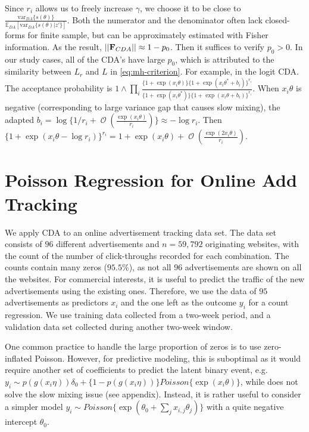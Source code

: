 \documentclass[10pt]{article}
\newcommand{\xbeta}{ x_i \theta}
\newcommand{\bb}[1]{\mathbb{#1}}
\newcommand{\mc}[1]{\mathcal{#1}}
\DeclareMathOperator{\bigO}{\mc O}
\begin{document}
Since $r_i$ allows us to freely increase $\gamma$, we choose it to be close to $\frac{\mbox{var}_{DA}\{s(\theta) \} } {\bb E_{DA}  [  \mbox{var}_{DA}\{ s(\theta)|z'\}]}$. Both the numerator and the denominator often lack closed-forms for finite sample, but can be approximately estimated with Fisher information. As the result, $||{\bf F}_{CDA}||\approx 1 - p_0$. Then it suffices to verify $p_0>0$. In our study cases, all of the CDA's have large $p_0$, which is attributed to the similarity between $L_r$ and $L$ in \eqref{eq:mh-criterion}. For example, in the logit CDA. The acceptance probability is $1\wedge \prod_i\frac{ \{1+\exp(\xbeta)\}   \{1+\exp(\xbeta^*+b_i)\}^{r_i} } {  \{1+\exp(\xbeta^*)\}  \{1+\exp(\xbeta+b_i)\}^{r_i}    }$. When $\xbeta$ is negative (corresponding to large variance gap that causes slow mixing), the adapted $b_i  = \log\{ 1/r_{i} + \bigO (\frac{\exp(\xbeta)}{r_i} )\} \approx -\log r_i$. Then $\{ 1+\exp(\xbeta-\log r_i)\}^{r_i} = 1+\exp(\xbeta) + \bigO(\frac{\exp(2\xbeta) }{r_i})$.


\section{Poisson Regression for Online Add Tracking}

We apply CDA to an online advertisement tracking data set.  The data set consists of $96$ different advertisements and $n=59,792$ originating websites, with the count of the number of click-throughs recorded for each combination.  The counts contain many zeros ($95.5\%$), as not all $96$ advertisements are shown on all the websites. For commercial interests, it is useful  to predict the traffic of the new advertisements using the existing ones. Therefore, we use the data of $95$ advertisements as predictors $x_i$ and the one left as the outcome $y_i$ for a count regression. We use training data collected from a two-week period, and a validation data set collected during another two-week window. 

One common practice to handle the large proportion of zeros is to use zero-inflated Poisson. However, for predictive modeling, this is suboptimal as it would require another set of coefficients to predict the latent binary event, e.g. $y_i\sim p\left( g(x_i\eta)\right)  \delta_0+ \{ 1-p\left( g(x_i \eta) \right) \} Poisson\{\exp (x_i \theta)\}$, while does not solve the slow mixing issue (see appendix). Instead, it is rather useful to consider a simpler model  $y_i\sim Poisson\{\exp(\theta_0+ \sum_j x_{i,j}\theta_j)\}$ with a quite negative intercept $\theta_0$.
\end{document}
